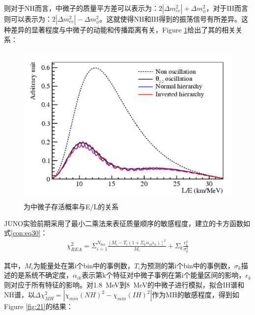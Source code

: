 \documentclass[10pt,a4paper]{article}
\begin{document}
则对于NH而言，中微子的质量平方差可以表示为：$2|\Delta{m_{ee}^2}|+\Delta{m_{\phi}^2}$，对于IH而言则可以表示为：$2|\Delta{m_{ee}^2}|-\Delta{m_{\phi}^2}$。这就使得NH和IH得到的振荡信号有所差异。这种差异的显著程度与中微子的动能和传播距离有关，Figure \ref{fig:11}给出了其的相关关系：
\begin{figure}[H]
 \centering
 \includegraphics[height=8cm]{images/L-selet.png}
 \caption{为中微子存活概率与E/L的关系\cite{2016Neutrino}}
 \label{fig:11}
\end{figure}


JUNO实验前期采用了最小二乘法来表征质量顺序的敏感程度，建立的卡方函数如式\eqref{con:eq30}：
\begin{equation}
 \label{con:eq30}
 \begin{split}
    \chi_{REA}^2=\Sigma_{i=1}^{N_{bin}}\frac{[M_i-T_i(1+\Sigma_{k}\alpha_{ik} \epsilon_{k})]^2}{M_{i}}+\Sigma_{k}
\frac{\epsilon_k^2}{\sigma_k^2} 
\end{split}
 \end{equation}

其中，$M_i$为能量处在第i个bin中的事例数，$T_i$为预测的第i个bin中的事例数，$\sigma_k$描述的是系统不确定度，$\alpha_{ik}$表示第k个特征对中微子事例在第i个能量区间的影响，$\epsilon_k$则对应于所有特征的影响。对\SI{1.8}{MeV}到\SI{8}{MeV}的中微子进行模拟，拟合IH谱和NH谱，以$\Delta\chi_{MH}^2=|\chi_{min}(NH)^2-\chi_{min}(IH)^2|
$作为MH的敏感程度，得到如Figure \ref{fig:21}的结果\cite{2016Neutrino}：
\end{document}
